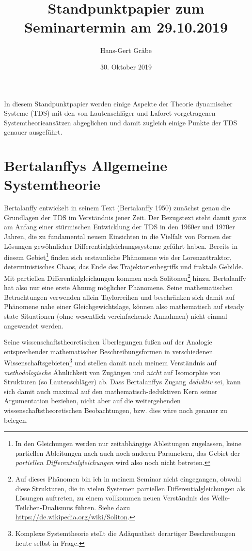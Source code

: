 \documentclass[11pt,a4paper]{article}
\title{Standpunktpapier zum Seminartermin am 29.10.2019}
\author{Hans-Gert Gr\"abe}
\date{30. Oktober 2019}
\begin{document}
\maketitle

In diesem Standpunktpapier werden einige Aspekte der Theorie dynamischer
Systeme (TDS) mit den von Lautenschläger und Laforet vorgetragenen
Systemtheorieansätzen abgeglichen und damit zugleich einige Punkte der TDS
genauer ausgeführt.

\section{Bertalanffys Allgemeine Systemtheorie}

Bertalanffy entwickelt in seinem Text (Bertalanffy 1950) zunächst genau die
Grundlagen der TDS im Verständnis jener Zeit.  Der Bezugstext steht damit ganz
am Anfang einer stürmischen Entwicklung der TDS in den 1960er und 1970er
Jahren, die zu fundamental neuem Einsichten in die Vielfalt von Formen der
Lösungen gewöhnlicher Differentialgleichungssysteme geführt haben.  Bereits in
diesem Gebiet\footnote{In den Gleichungen werden nur zeitabhängige Ableitungen
  zugelassen, keine partiellen Ableitungen nach auch noch anderen Parametern,
  das Gebiet der \emph{partiellen Differentialgleichungen} wird also noch
  nicht betreten.} finden sich erstaunliche Phänomene wie der Lorenzattraktor,
deterministisches Chaos, das Ende des Trajektorienbegriffs und fraktale
Gebilde. Mit partiellen Differentialgleichungen kommen noch
Solitonen\footnote{Auf dieses Phänomen bin ich in meinem Seminar nicht
  eingegangen, obwohl diese Strukturen, die in vielen Systemen partiellen
  Differentialgleichungen als Lösungen auftreten, zu einem vollkommen neuen
  Verständnis des Welle-Teilchen-Dualismus führen. Siehe dazu
  \url{https://de.wikipedia.org/wiki/Soliton}. } hinzu. Bertalanffy hat also
nur eine erste Ahnung möglicher Phänomene. Seine mathematischen Betrachtungen
verwenden allein Taylorreihen und beschränken sich damit auf Phänomene nahe
einer Gleichgewichtslage, können also mathematisch auf steady state
Situationen (ohne wesentlich vereinfachende Annahmen) nicht einmal angewendet
werden.

Seine wissenschaftstheoretischen Überlegungen fußen auf der Analogie
entsprechender mathematischer Beschreibungsformen in verschiedenen
Wissenschaftsgebieten\footnote{Komplexe Systemtheorie stellt die Adäquatheit
  derartiger Beschreibungen heute selbst in Frage.} und stellen damit nach
meinem Verständnis auf \emph{methodologische} Ähnlichkeit von Zugängen und
\emph{nicht} auf Isomorphie von Strukturen (so Lautenschläger) ab. Dass
Bertalanffys Zugang \emph{deduktiv} sei, kann sich damit auch maximal auf den
mathematisch-deduktiven Kern seiner Argumentation beziehen, nicht aber auf die
weitergehenden wissenschaftstheoretischen Beobachtungen, bzw. dies wäre noch
genauer zu belegen.
\end{document}
